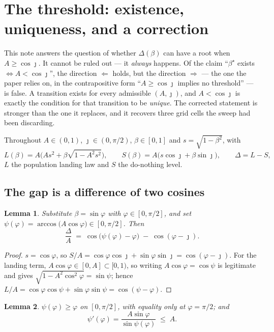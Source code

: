 \documentclass[11pt]{article}
\newtheorem{lemma}{Lemma}
\theoremstyle{definition}
\theoremstyle{remark}
\begin{document}
\section*{The threshold: existence, uniqueness, and a correction}

This note answers the question of whether $\Delta(\beta)$ can have a root when
$A\ge\cos\jmath$. It cannot be ruled out --- it \emph{always} happens. Of the claim
``$\beta^\star$ exists $\iff A<\cos\jmath$'', the direction $\Longleftarrow$ holds, but the
direction $\Longrightarrow$ --- the one the paper relies on, in the contrapositive form
``$A\ge\cos\jmath$ implies no threshold'' --- is false. A transition exists for every admissible
$(A,\jmath)$, and $A<\cos\jmath$ is exactly the condition for that transition to be
\emph{unique}. The corrected statement is stronger than the one it replaces, and it recovers
three grid cells the sweep had been discarding.

Throughout $A\in(0,1)$, $\jmath\in(0,\pi/2)$, $\beta\in[0,1]$ and $s=\sqrt{1-\beta^2}$, with
\[
L(\beta)=A\big(As^{2}+\beta\sqrt{1-A^{2}s^{2}}\big),\qquad
S(\beta)=A\big(s\cos\jmath+\beta\sin\jmath\big),\qquad
\Delta=L-S,
\]
$L$ the population landing law and $S$ the do-nothing level.

\subsection*{The gap is a difference of two cosines}

\begin{lemma}\label{lem:angle}
Substitute $\beta=\sin\varphi$ with $\varphi\in[0,\pi/2]$, and set
$\psi(\varphi)=\arccos\!\big(A\cos\varphi\big)\in[0,\pi/2]$. Then
\[
\frac{\Delta}{A}\;=\;\cos\!\big(\psi(\varphi)-\varphi\big)\;-\;\cos(\varphi-\jmath).
\]
\end{lemma}

\begin{proof}
$s=\cos\varphi$, so $S/A=\cos\varphi\cos\jmath+\sin\varphi\sin\jmath=\cos(\varphi-\jmath)$.
For the landing term, $A\cos\varphi\in[0,A]\subset[0,1)$, so writing $A\cos\varphi=\cos\psi$ is
legitimate and gives $\sqrt{1-A^{2}\cos^{2}\varphi}=\sin\psi$; hence
$L/A=\cos\varphi\cos\psi+\sin\varphi\sin\psi=\cos(\psi-\varphi)$.
\end{proof}

\begin{lemma}\label{lem:psi}
$\psi(\varphi)\ge\varphi$ on $[0,\pi/2]$, with equality only at $\varphi=\pi/2$; and
\[
\psi'(\varphi)=\frac{A\sin\varphi}{\sin\psi(\varphi)}\;\le\;A .
\]
\end{lemma}
\end{document}

